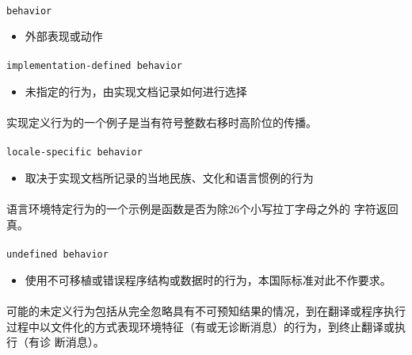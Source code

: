 \paragraph{}
\texttt{behavior}
\begin{itemize}
  \item[]{外部表现或动作}
\end{itemize}

\paragraph{}
\texttt{implementation-defined behavior}
\begin{itemize}
  \item[]{未指定的行为，由实现文档记录如何进行选择}
\end{itemize}

\paragraph{}
\ex* 实现定义行为的一个例子是当有符号整数右移时高阶位的传播。

\paragraph{}
\texttt{locale-specific behavior}
\begin{itemize}
  \item[]{取决于实现文档所记录的当地民族、文化和语言惯例的行为}
\end{itemize}

\paragraph{}
\ex* 语言环境特定行为的一个示例是函数是否为除26个小写拉丁字母之外的
字符返回真。

\paragraph{}
\texttt{undefined behavior}
\begin{itemize}
  \item[]{使用不可移植或错误程序结构或数据时的行为，本国际标准对此不作要求。}
\end{itemize}

\paragraph{}
\notes* 可能的未定义行为包括从完全忽略具有不可预知结果的情况，到在翻译或程序执行
过程中以文件化的方式表现环境特征（有或无诊断消息）的行为，到终止翻译或执行（有诊
断消息）。

